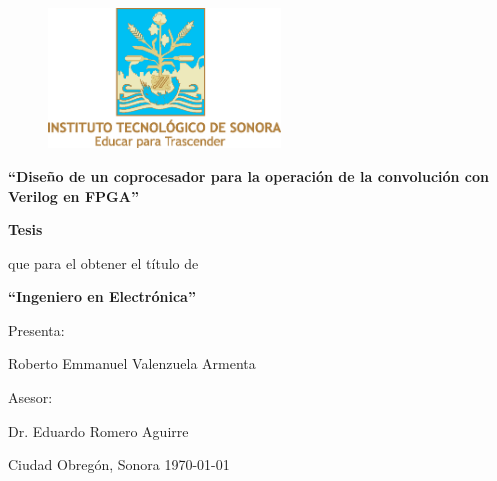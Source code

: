 \thispagestyle{empty}
\begin{figure}[!t]
\centering
\includegraphics[width=0.55\textwidth, height=0.25\textheight]{./figs/logoclr}
\end{figure}

\begin{center}

{\bf \LARGE ``Diseño de un coprocesador para la operación de la convolución con Verilog en FPGA''}

\vspace*{0.75cm}

{\bf \Large Tesis }

\vspace*{0.65cm}

{\Large que para el obtener el título de}

\vspace{0.65cm}

{\bf \Large ``Ingeniero en Electrónica''}

\vspace{0.75cm}

\begin{framed}

{\large Presenta:}

\vspace{0.3cm}

{\large Roberto Emmanuel Valenzuela Armenta}

\vspace{0.3cm}

{\large Asesor:}

\vspace{0.3cm}

{\large Dr. Eduardo Romero Aguirre}

\end{framed}

\vfill

\begin{shaded*}
{\large {\color{white}Ciudad Obregón, Sonora \hfill \today}}
\end{shaded*}

\end{center}

\pagebreak